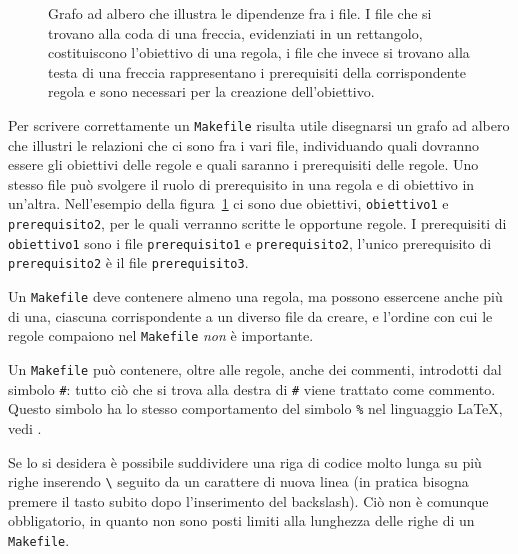 \begin{figure}
  \centering
  \caption{Grafo ad albero che illustra le dipendenze fra i file.  I file che si
    trovano alla coda di una freccia, evidenziati in un rettangolo,
    costituiscono l'obiettivo di una regola, i file che invece si trovano alla
    testa di una freccia rappresentano i prerequisiti della corrispondente
    regola e sono necessari per la creazione dell'obiettivo.}
  \label{fig:grafo-albero1}
\end{figure}
Per scrivere correttamente un \verb|Makefile| risulta utile disegnarsi un grafo
ad albero che illustri le relazioni che ci sono fra i vari file, individuando
quali dovranno essere gli obiettivi delle regole e quali saranno i prerequisiti
delle regole.  Uno stesso file può svolgere il ruolo di prerequisito in una
regola e di obiettivo in un'altra.  Nell'esempio della
figura~\ref{fig:grafo-albero1} ci sono due obiettivi, \verb|obiettivo1| e
\verb|prerequisito2|, per le quali verranno scritte le opportune regole.  I
prerequisiti di \verb|obiettivo1| sono i file \verb|prerequisito1| e
\verb|prerequisito2|, l'unico prerequisito di \verb|prerequisito2| è il file
\verb|prerequisito3|.

Un \verb|Makefile| deve contenere almeno una regola, ma possono essercene anche
più di una, ciascuna corrispondente a un diverso file da creare, e l'ordine con
cui le regole compaiono nel \verb|Makefile| \emph{non} è importante.

Un \verb|Makefile| può contenere, oltre alle regole, anche dei commenti,
introdotti dal simbolo \verb|#|: tutto ciò che si trova alla destra di \verb|#|
viene trattato come commento.  Questo simbolo ha lo stesso comportamento del
simbolo \verb|%| nel linguaggio \LaTeX{}, vedi \textcite[26]{pantieri:latex}.

Se lo si desidera è possibile suddividere una riga di codice molto lunga su più
righe inserendo \verb|\| seguito da un carattere di nuova linea (in pratica
bisogna premere il tasto  subito dopo l'inserimento del
backslash).  Ciò non è comunque obbligatorio, in quanto non sono posti limiti
alla lunghezza delle righe di un \verb|Makefile|.


